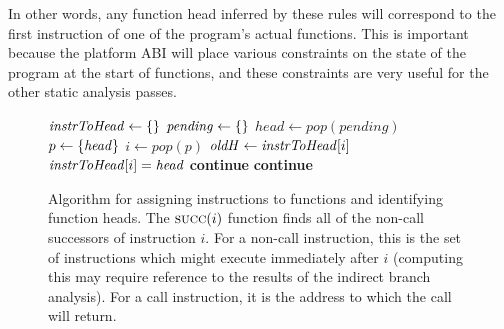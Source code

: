 In other words, any function head inferred by these rules will
correspond to the first instruction of one of the program's actual
functions.  This is important because the platform ABI will place
various constraints on the state of the program at the start of
functions, and these constraints are very useful for the other static
analysis passes.

\begin{figure}
\begin{algorithmic}[1]
  \State $\mathit{instrToHead} \gets \{\}$
  \State $\mathit{pending} \gets \{\}$
    \State $\mathit{head} \gets \mathit{pop}(\mathit{pending})$
    \State $p \gets \{\mathit{head}\}$
      \State $i \gets \mathit{pop}(p)$
      \State $\mathit{oldH} \gets \mathit{instrToHead}[i]$
       
        \State $\mathit{instrToHead}[i] = \mathit{head}$
        \EndIf
       
        \State \textbf{continue}
       
        \State \textbf{continue}
      \Else {}
      \EndIf
    \EndWhile
  \EndWhile
\end{algorithmic}
\caption{Algorithm for assigning instructions to functions and
  identifying function heads.  The $\textsc{succ}(i)$ function finds
  all of the non-call successors of instruction $i$.  For a non-call
  instruction, this is the set of instructions which might execute
  immediately after $i$ (computing this may require reference to the
  results of the indirect branch analysis).  For a call instruction,
  it is the address to which the call will return. }
\label{fig:function_head_alg}
\end{figure}

